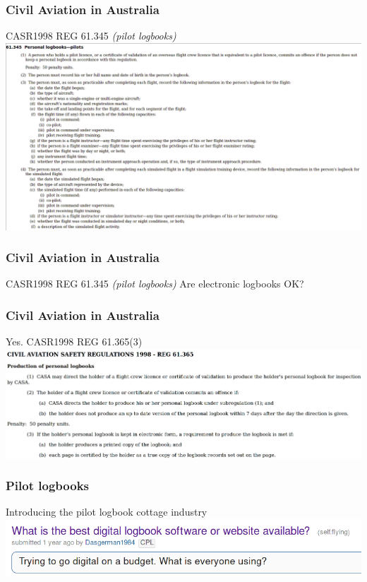 \begin{frame}
\frametitle{Civil Aviation in Australia}
\begin{block}{CASR1998 REG 61.345 \emph{(pilot logbooks)}}
\includegraphics[height=0.6\textheight]{image/casr-logbook.png}
\end{block}
\end{frame}

\begin{frame}
\frametitle{Civil Aviation in Australia}
\begin{block}{CASR1998 REG 61.345 \emph{(pilot logbooks)}}
Are electronic logbooks OK?
\end{block}
\end{frame}

\begin{frame}
\frametitle{Civil Aviation in Australia}
\begin{block}{Yes. CASR1998 REG 61.365(3)}
\includegraphics[height=0.3\textheight]{image/casr-logbook-production.png}
\end{block}
\end{frame}

\begin{frame}
\frametitle{Pilot logbooks}
\begin{center}
Introducing the pilot logbook cottage industry
\includegraphics[height=0.1\textheight]{image/reddit-logbooks.png}
\end{center}
\end{frame}

